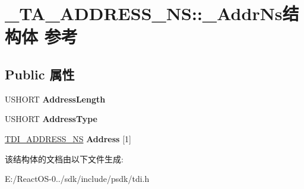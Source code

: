 \hypertarget{struct___t_a___a_d_d_r_e_s_s___n_s_1_1___addr_ns}{}\section{\+\_\+\+T\+A\+\_\+\+A\+D\+D\+R\+E\+S\+S\+\_\+\+NS\+:\+:\+\_\+\+Addr\+Ns结构体 参考}
\label{struct___t_a___a_d_d_r_e_s_s___n_s_1_1___addr_ns}
\subsection*{Public 属性}
\begin{DoxyCompactItemize}
\item 
\mbox{\label{struct___t_a___a_d_d_r_e_s_s___n_s_1_1___addr_ns_ae671b14ce1c1034e1211323a67e07c06}} 
U\+S\+H\+O\+RT {\bfseries Address\+Length}
\item 
\mbox{\label{struct___t_a___a_d_d_r_e_s_s___n_s_1_1___addr_ns_a3b02fc04894daf9df005e9d13bc67c0f}} 
U\+S\+H\+O\+RT {\bfseries Address\+Type}
\item 
\mbox{\label{struct___t_a___a_d_d_r_e_s_s___n_s_1_1___addr_ns_a3236cc5a842f42f7da54909c3c050557}} 
\hyperlink{struct___t_d_i___a_d_d_r_e_s_s___n_s}{T\+D\+I\+\_\+\+A\+D\+D\+R\+E\+S\+S\+\_\+\+NS} {\bfseries Address} \mbox{[}1\mbox{]}
\end{DoxyCompactItemize}


该结构体的文档由以下文件生成\+:\begin{DoxyCompactItemize}
\item 
E\+:/\+React\+O\+S-\/0../sdk/include/psdk/tdi.\+h\end{DoxyCompactItemize}
